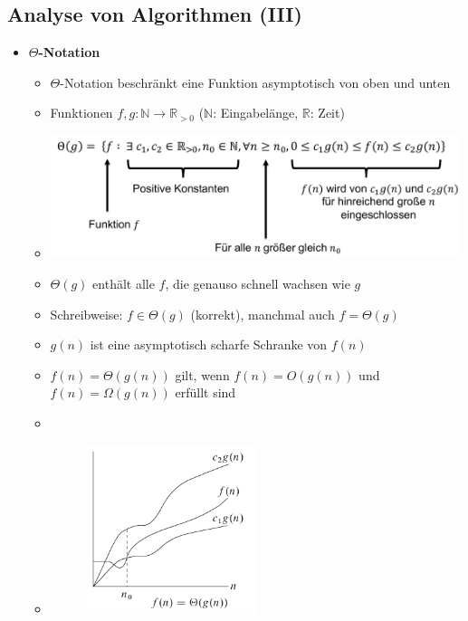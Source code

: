 \documentclass[
    ngerman,
    color=3b,
    load_common, %
    summary,
    boxarc,
]{tuda_summary}
\begin{document}
\subsection{Analyse von Algorithmen \textmd{(III)}}\label{Analyse von Algorithmen 3}
\begin{itemize}
    \item \textbf{$\Theta$-Notation}
          \begin{itemize}
              \item $\Theta$-Notation beschränkt eine Funktion asymptotisch von oben und unten
              \item Funktionen $f,g: \mathbb{N} \rightarrow \mathbb{R}_{>0}$ ($\mathbb{N}$: Eingabelänge, $\mathbb{R}$: Zeit)
              \item[] \includegraphics[width=12cm]{pictures/thetaNotation.pdf}
              \item $\Theta(g)$ enthält alle $f$, die genauso schnell wachsen wie $g$
              \item Schreibweise: $f \in \Theta(g)$ (korrekt), manchmal auch $f = \Theta(g)$
              \item $g(n)$ ist eine asymptotisch scharfe Schranke von $f(n)$
              \item $f(n)= \Theta(g(n))$ gilt, wenn $f(n) = O(g(n))$ und $f(n)=\Omega(g(n))$ erfüllt sind
              \item[]
              \item[]
                    \begin{minipage}{0.3\textwidth}
                        \begin{figure}[H]
                            \centering
                            \includegraphics[width=5cm]{pictures/thetaNotationGraph.pdf}

\end{figure}
\end{minipage}
\end{itemize}
\end{itemize}
\end{document}
